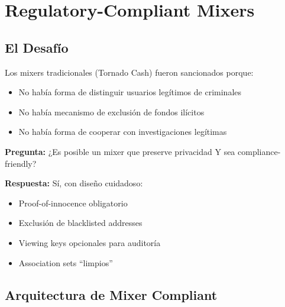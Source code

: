 \documentclass[11pt,a4paper,twoside]{book}
\theoremstyle{definition}
\theoremstyle{remark}
\begin{document}
\section{Regulatory-Compliant Mixers}
\label{sec:compliant-mixers}

\subsection{El Desafío}

\begin{intuicion}
Los mixers tradicionales (Tornado Cash) fueron sancionados porque:
\begin{itemize}
    \item No había forma de distinguir usuarios legítimos de criminales
    \item No había mecanismo de exclusión de fondos ilícitos
    \item No había forma de cooperar con investigaciones legítimas
\end{itemize}

\textbf{Pregunta:} ¿Es posible un mixer que preserve privacidad Y sea compliance-friendly?

\textbf{Respuesta:} Sí, con diseño cuidadoso:
\begin{itemize}
    \item Proof-of-innocence obligatorio
    \item Exclusión de blacklisted addresses
    \item Viewing keys opcionales para auditoría
    \item Association sets ``limpios''
\end{itemize}
\end{intuicion}

\subsection{Arquitectura de Mixer Compliant}
\end{document}
